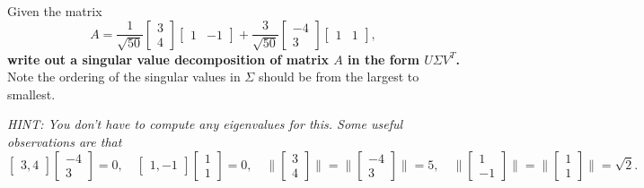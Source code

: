 

Given the matrix $$A = \frac{1}{\sqrt{50}} \begin{bmatrix}
    3\\
    4
  \end{bmatrix}
   \begin{bmatrix}
    1 & -1
  \end{bmatrix} +
  \frac{3}{\sqrt{50}} \begin{bmatrix}
    -4\\
    3
  \end{bmatrix}
   \begin{bmatrix}
    1 & 1
  \end{bmatrix}, $$ \textbf{write out a singular value decomposition
    of matrix $A$ in the form $U \Sigma V^T$.} Note the ordering of the singular values in $\Sigma$ should be from the largest to smallest.

{\em HINT: You don't have to compute any eigenvalues for this.   Some
  useful observations are that 
$$\begin{bmatrix}
    3, 
    4
  \end{bmatrix} \begin{bmatrix}
    -4\\
    3
  \end{bmatrix} = 0,  \quad \begin{bmatrix}
    1,
    -1
  \end{bmatrix} \begin{bmatrix}
    1\\
    1
  \end{bmatrix} = 0, \quad \| \begin{bmatrix}
    3\\
    4
  \end{bmatrix} \| = \| \begin{bmatrix}
    -4\\
    3
  \end{bmatrix} \| = 5, \quad \| \begin{bmatrix}
    1\\
    -1
  \end{bmatrix} \| = \| \begin{bmatrix}
    1\\
    1  \end{bmatrix} \| = \sqrt{2}.$$ }

